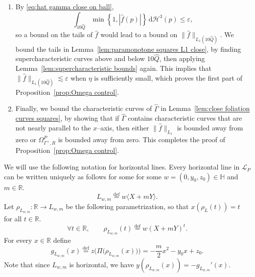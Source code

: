 \documentclass[11pt,reqno]{amsart}
\renewcommand{\H}{\mathbb{H}}
\newcommand{\R}{\mathbb{R}}
\newcommand{\cH}{\mathcal{H}}
\newcommand{\cL}{\mathcal{L}}
\renewcommand{\epsilon}{\varepsilon}
\newcommand{\ud}[0]{\,\mathrm{d}}
\newcommand{\0}{\mathbf{0}}
\renewcommand{\1}{\mathbf 1}
\newcommand{\from}{\colon}
\newcommand{\symdiff}{\mathbin{\triangle}}
\renewcommand{\subset}{\subseteq}
\newcommand{\eqdef}{\stackrel{\mathrm{def}}{=}}
\renewcommand{\le}{\leqslant}
\theoremstyle{remark}
\begin{document}
\begin{enumerate}
  We then apply an automorphism that sends $P$ to $V_0$.  Since the slope and $y$--intercept of $P$ are bounded, there is a universal constant $c>0$ and a map $q\from \H\to \H$ (a composition of a left translation in the $y$--direction and a shear) such that $q(P)=V_0$ and
  $B_{c^{-1}s-c}\subset q(B_s)\subset B_{cs+c}$
  for all $s>c^2$.  We let $\hat{\Gamma}=q(\Gamma)$, $\hat{Q}=\hat{q}(Q)=\Pi(q(Q))$, and let $\hat{f}$ be such that $\hat{\Gamma}=\Gamma_{\hat{f}}$.  Since $q$ preserves $\cH^4$,
  \begin{equation}\label{eq:hat gamma close on ball}
    \cH^4\left((\hat{\Gamma}^+\symdiff V_0^+)\cap \overline{B}_{c^{-1}r-c}\right)<\epsilon.
  \end{equation}
  This inequality controls $\hat{f}$ on $V_0\cap \overline{B}_{c^{-1}r-c}$, and we choose $r$ large enough that $11\hat{Q}\subset \overline{B}_{c^{-1}r-c}$.
\item
  By \eqref{eq:hat gamma close on ball},
  $$\int_{10 \hat{Q}} \min\left\{1,|\hat{f}(p)|\right\} \ud \cH^3(p) \le \epsilon,$$
  so a bound on the tails of $\hat{f}$ would lead to a bound on $\|\hat{f}\|_{L_1(10\hat{Q})}$.  We bound the tails in Lemma~\ref{lem:paramonotone squares L1 close}, by finding supercharacteristic curves above and below $10\hat{Q}$, then applying Lemma~\ref{lem:supercharacteristic bounds} again.  This implies that $\|\hat{f}\|_{L_1(10\hat{Q})}\lesssim \epsilon$ when $\eta$ is sufficiently small, which proves the first part of Proposition~\ref{prop:Omega control}.
\item
  Finally, we bound the characteristic curves of $\hat{\Gamma}$ in Lemma~\ref{lem:close foliation curves squares}, by showing that if $\hat{\Gamma}$ contains characteristic curves that are not nearly parallel to the $x$--axis, then either $\|\hat{f}\|_{L_1}$ is bounded away from zero or $\Omega^P_{\Gamma^+,R}$ is  bounded away from zero.  This completes the proof of Proposition~\ref{prop:Omega control}.
\end{enumerate}

We will use the following notation for horizontal lines. Every horizontal line in $\cL_P$ can be written uniquely as follows for some for some $w=(0,y_0,z_0) \in \H$ and $m\in \R$.
$$
L_{w,m}\eqdef w \langle X+ mY\rangle.
$$
Let $\rho_{L_{w,m}}\from \R\to L_{w,m}$ be the following parametrization, so that $x(\rho_L(t))=t$ for all $t\in \R$.
$$
\forall t\in \R,\qquad \rho_{L_{w,m}}(t)\eqdef w (X+mY)^t.
$$
For every $x\in \R$ define
\begin{equation}\label{eq:def gL}
g_{L_{w,m}}(x)\eqdef z\Big(\Pi\big(\rho_{L_{w,m}}(x)\big)\Big)=-\frac{m}{2} x^2- y_0 x + z_0.
\end{equation}
Note that since $L_{w,m}$ is horizontal, we have $y(\rho_{L_{w,m}}(x))=-g_{L_{w,m}}'(x)$.
\end{document}
